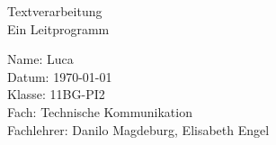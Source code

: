\documentclass[a4paper, 11pt]{scrartcl}
\begin{document}
	\ofoot{\pagemark}
	\cfoot{}
	\begin{titlepage}
		\color{heading}
	 	\begin{flushleft}
			{\fontsize{28}{10}Textverarbeitung} \\
			\color{black} {Ein Leitprogramm}

	  	\vfill
	  	
					 Name:   	   \hspace{2mm} Luca \\
		\vspace{2mm} Datum:  	   \hspace{1mm} \today \\ %
		\vspace{5mm} Klasse: 	   \hspace{2mm} 11BG-PI2 \\
		\vspace{10mm} Fach:   	   \hspace{14mm} Technische Kommunikation \\
					 Fachlehrer:   \hspace{5mm} Danilo Magdeburg, Elisabeth Engel
		\end{flushleft}
	\end{titlepage}
	
	\tableofcontents
	
	\newpage
\end{document}
